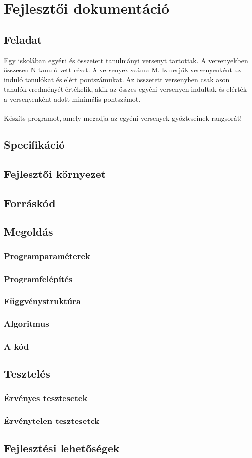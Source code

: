 \documentclass{article}
\begin{document}
  \section{Fejlesztői dokumentáció}
    \subsection{Feladat}
      Egy iskolában egyéni és összetett tanulmányi versenyt tartottak. A versenyekben összesen N tanuló vett részt. A versenyek száma M. Ismerjük versenyenként az induló tanulókat és elért pontszámukat. Az összetett versenyben csak azon tanulók eredményét értékelik, akik az összes egyéni versenyen indultak és elérték a versenyenként adott minimális pontszámot.
      \\
      \\ Készíts programot, amely megadja az egyéni versenyek győzteseinek rangsorát!
    \subsection{Specifikáció}
    \subsection{Fejlesztői környezet}
    \subsection{Forráskód}
    \subsection{Megoldás}
      \subsubsection{Programparaméterek}
      \subsubsection{Programfelépítés}
      \subsubsection{Függvénystruktúra}
      \subsubsection{Algoritmus}
      \subsubsection{A kód}
    \subsection{Tesztelés}
      \subsubsection{Érvényes tesztesetek}
      \subsubsection{Érvénytelen tesztesetek}
    \subsection{Fejlesztési lehetőségek}
\end{document}
